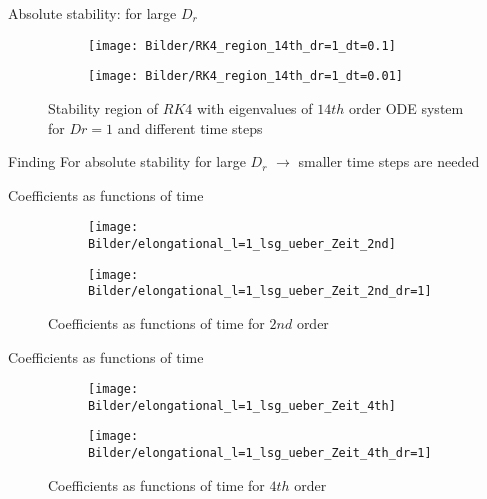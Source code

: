 \begin{frame}{Absolute stability: for large $D_r$}
	\begin{figure}
		\begin{subfigure}{0.48\textwidth}
			\texttt{[image: Bilder/RK4\_region\_14th\_dr=1\_dt=0.1]}
		\end{subfigure}
		\hfill
		\begin{subfigure}{0.48\textwidth}
			\texttt{[image: Bilder/RK4\_region\_14th\_dr=1\_dt=0.01]}
		\end{subfigure}
		\caption{Stability region of $RK4$ with eigenvalues of $14th$ order ODE system for $Dr=1$ and different time steps}
	\end{figure}

	\begin{block}{Finding}
	For absolute stability for large $D_r$  $\rightarrow$ smaller time steps are needed
	\end{block}
\end{frame}


\begin{frame}{Coefficients as functions of time}
	\begin{figure}
		\begin{subfigure}{0.48\textwidth}
			\texttt{[image: Bilder/elongational\_l=1\_lsg\_ueber\_Zeit\_2nd]}
		\end{subfigure}
		\hfill
		\begin{subfigure}{0.48\textwidth}
			\texttt{[image: Bilder/elongational\_l=1\_lsg\_ueber\_Zeit\_2nd\_dr=1]}
		\end{subfigure}
		\caption{Coefficients as functions of time for $2nd$ order}
	\end{figure}
\end{frame}


\begin{frame}{Coefficients as functions of time}
	\begin{figure}
		\begin{subfigure}{0.48\textwidth}
			\texttt{[image: Bilder/elongational\_l=1\_lsg\_ueber\_Zeit\_4th]}
		\end{subfigure}
		\hfill
		\begin{subfigure}{0.48\textwidth}
			\texttt{[image: Bilder/elongational\_l=1\_lsg\_ueber\_Zeit\_4th\_dr=1]}
		\end{subfigure}
		\caption{Coefficients as functions of time for $4th$ order}
	\end{figure}
\end{frame}


